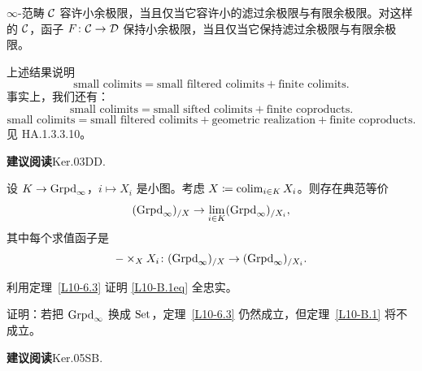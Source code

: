 \begin{corollary}\label{L10-A.9}
$\infty$-范畴 $\mathcal{C}$ 容许小余极限，当且仅当它容许小的滤过余极限与有限余极限。对这样的 $\mathcal{C}$，函子 $F\colon\mathcal{C}\to\mathcal{D}$ 保持小余极限，当且仅当它保持滤过余极限与有限余极限。
\end{corollary}

\nitem\label{L10-A.10} 上述结果说明
\[
\text{small colimits}=\text{small filtered colimits}+\text{finite colimits}.
\]
事实上，我们还有：
\[
\text{small colimits}=\text{small sifted colimits}+\text{finite coproducts}.
\]
\[
\text{small colimits}=\text{small filtered colimits}+\text{geometric realization}+\text{finite coproducts}.
\]
见 HA.1.3.3.10。

\nitem\label{L10-A.11} \textbf{建议阅读}\quad Ker.03DD.


\begin{theorem}\label{L10-B.1}
设 $K\to\operatorname{Grpd}_\infty$，$i\mapsto X_i$ 是小图。考虑 $X\coloneqq\operatorname{colim}_{i\in K}X_i$。则存在典范等价
\begin{equation}\label{L10-B.1eq}
(\operatorname{Grpd}_\infty)_{/X}\to\lim_{i\in K}(\operatorname{Grpd}_\infty)_{/X_i},
\end{equation}
其中每个求值函子是
\[
-\times_X X_i\colon(\operatorname{Grpd}_\infty)_{/X}\to(\operatorname{Grpd}_\infty)_{/X_i}.
\]
\end{theorem}

\begin{exercise}\label{L10-B.2}
利用定理~\ref{L10-6.3} 证明 \eqref{L10-B.1eq} 全忠实。
\end{exercise}

\begin{exercise}\label{L10-B.3}
证明：若把 $\operatorname{Grpd}_\infty$ 换成 $\operatorname{Set}$，定理~\ref{L10-6.3} 仍然成立，但定理~\ref{L10-B.1} 将不成立。
\end{exercise}

\nitem\label{L10-B.4} \textbf{建议阅读}\quad Ker.05SB.
